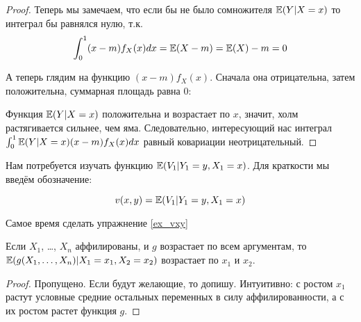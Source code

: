 \begin{proof}
Теперь мы замечаем, что если бы не было сомножителя $ \mathbb{E}(Y|X=x) $ то интеграл бы равнялся нулю, т.к.
\begin{equation}
\int_{0}^{1}(x-m)f_{X}(x)dx=\mathbb{E}(X-m)=\mathbb{E}(X)-m=0
\end{equation}

А теперь глядим на функцию $ (x-m)f_{X}(x) $. Сначала она отрицательна, затем положительна, суммарная площадь равна 0:



Функция $ \mathbb{E}(Y|X=x) $ положительна и возрастает по $ x $, значит, холм растягивается сильнее, чем яма. Следовательно, интересующий нас интеграл $ \int_{0}^{1}\mathbb{E}(Y|X=x)(x-m)f_{X}(x)dx $ равный ковариации неотрицательный.


\end{proof}



Нам потребуется изучать функцию $ \mathbb{E}(V_{1}|Y_{1}=y, X_{1}=x) $.  Для краткости мы введём обозначение:

\begin{mydef}
\begin{equation}
v(x,y)=\mathbb{E}(V_{1}|Y_{1}=y, X_{1}=x)
\end{equation}
\end{mydef}

Самое время сделать упражнение \ref{ex_vxy}

\begin{myth}
\label{aff_multi_f}
Если $ X_{1} $, \ldots, $ X_{n} $ аффилированы, и $ g $ возрастает по всем аргументам, то $\mathbb{E}(g(X_{1},\ldots,X_{n})|X_{1}=x_{1},X_{2}=x_{2}) $ возрастает по $ x_{1} $ и $ x_{2} $.
\end{myth}

\begin{proof}
Пропущено. Если будут желающие, то допишу. Интуитивно: с ростом $ x_{1} $ растут условные средние остальных переменных в силу аффилированности, а с их ростом растет функция $ g $.
\end{proof}

